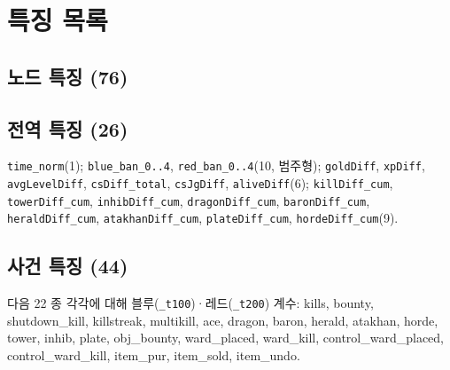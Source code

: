 
\chapter{특징 목록}
\label{app:features}

\section{노드 특징 (76)}



\section{전역 특징 (26)}

{\raggedright
\texttt{time\_norm}(1); \texttt{blue\_ban\_0..4}, \texttt{red\_ban\_0..4}(10, 범주형); \texttt{goldDiff}, \texttt{xpDiff}, \texttt{avgLevelDiff}, \texttt{csDiff\_total}, \texttt{csJgDiff}, \texttt{aliveDiff}(6); \texttt{killDiff\_cum}, \texttt{towerDiff\_cum}, \texttt{inhibDiff\_cum}, \texttt{dragonDiff\_cum}, \texttt{baronDiff\_cum}, \texttt{heraldDiff\_cum}, \texttt{atakhanDiff\_cum}, \texttt{plateDiff\_cum}, \texttt{hordeDiff\_cum}(9).
\par}

\section{사건 특징 (44)}

{\raggedright
다음 22 종 각각에 대해 블루(\texttt{\_t100})·레드(\texttt{\_t200}) 계수: kills, bounty, shutdown\_kill, killstreak, multikill, ace, dragon, baron, herald, atakhan, horde, tower, inhib, plate, obj\_bounty, ward\_placed, ward\_kill, control\_ward\_placed, control\_ward\_kill, item\_pur, item\_sold, item\_undo.
\par}
